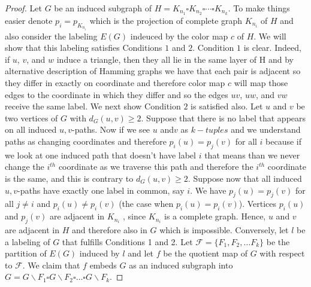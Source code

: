 \documentclass[12pt,a4paper,titlepage,openany]{report}
\begin{document}
\begin{proof}
Let $G$ be an induced subgraph of $H=K_{n_1}\square K_{n_2}\square\cdots\square K_{n_k}$. To make things easier denote $p_i=p_{K_{n_i}}$ which is the projection of complete graph $K_{n_i}$ of $H$ and also consider the labeling $E(G)$ indeuced by the color map $c$ of $H$. We will show that this labeling satisfies Conditions $1$ and $2$.\newline
Condition $1$ is clear. Indeed, if $u$, $v$, and $w$ induce a triangle, then they all lie in
the same layer of H and by alternative description of Hamming graphs we have that each pair is adjacent so they differ in exactly on coordinate and therefore color map $c$ will map those edges to the coordinate in which they differ and so the edges $uv$, $uw$, and $vw$ receive the same label.\newline
We next show Condition $2$ is satisfied also. Let $u$ and $v$ be two vertices of $G$ with $d_G(u,v)\geq 2$.
Suppose that there is no label that appears on all induced $u, v$-paths. Now if we see $u$ and$v$ as $k-tuples$ and we understand paths as changing coordinates and therefore $p_i(u)=p_j(v)$ for all $i$ because if we look at one induced path that doesn't have label $i$ that means than we never change the $i^{th}$ coordinate as we traverse this path and therefore the $i^{th}$ coordinate is the same, and this is contrary to $d_G(u,v)\geq 2$. Suppose now that all induced $u, v$-paths have exactly one label in common, say $i$. We have $p_j(u)=p_j(v)$ for all $j\neq i$ and $p_i(u)\neq p_i(v)$ (the case when $p_i(u)= p_i(v)$). Vertices $p_i(u)$ and $p_j(v)$ are adjacent in $K_{n_i}$ , since $K_{n_i}$ is a complete graph. Hence, $u$ and $v$ are adjacent in $H$ and therefore also in $G$ which is impossible.\newline
Conversely, let $l$ be a labeling of $G$ that fulfills Conditions 1 and 2. Let $\mathcal{F}=\{F_1,F_2,\ldots F_k\}$ be the partition of $E(G)$ induced by $l$ and let $f$ be the quotient map of $G$ with respect to $\mathcal{F}$. We claim that $f$ embeds $G$ as an induced subgraph into $G=G\backslash F_1\square G\backslash F_2\square \ldots \square G\backslash F_k$.\newline

\end{proof}
\end{document}
